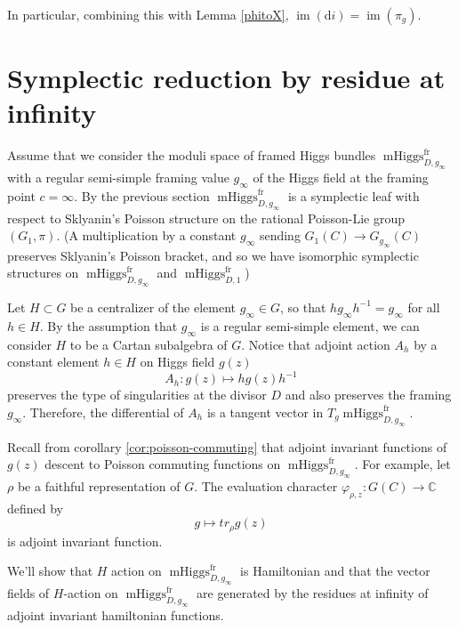 \documentclass[11pt, oneside, reqno]{amsart}
\theoremstyle{definition} \newtheorem{definition}{Definition}[section]
\theoremstyle{definition} \newtheorem{remark}[definition]{Remark}
\theoremstyle{definition} \newtheorem{remarks}[definition]{Remarks}
\theoremstyle{definition} \newtheorem{question}[definition]{Question}
\theoremstyle{definition} \newtheorem*{note}{Note}
\theoremstyle{definition} \newtheorem{example}[definition]{Example}
\theoremstyle{definition} \newtheorem{examples}[definition]{Examples}
\DeclareMathOperator{\tr}{tr}
\DeclareMathOperator{\mhiggs}{mHiggs}
\DeclareMathOperator{\im}{im}
\renewcommand{\d}{\mathrm{d}}
\newcommand{\fr}{\mathrm{fr}}
\begin{document}
In particular, combining this with Lemma \ref{phitoX}, $\im(\d i) = \im(\pi_g)$.



\section{Symplectic reduction by residue at infinity}

Assume that we consider the moduli space of framed Higgs bundles $\mhiggs^{\fr}_{D, g_{\infty}}$ 
with a regular semi-simple framing value $g_{\infty}$ of the Higgs field at the framing point $c = \infty$.
By the previous section $\mhiggs^{\fr}_{D, g_{\infty}}$ is a symplectic leaf with respect
to Sklyanin's Poisson structure on the rational Poisson-Lie group $(G_{1}, \pi)$. (A multiplication
by a constant $g_\infty$ sending $G_{1}(C) \to G_{g_{\infty}}(C)$ preserves
 Sklyanin's Poisson bracket, and so we have isomorphic symplectic structures on $\mhiggs^{\fr}_{D, g_{\infty}}$ and $\mhiggs^{\fr}_{D, 1}$)



Let $H \subset G$ be a centralizer of the element $g_\infty \in G$, so that $h g_\infty h^{-1}  = g_\infty$ for all $h \in H$. By the assumption that $g_\infty$ is a regular semi-simple element,
we can consider $H$ to be a Cartan subalgebra of $G$. Notice that adjoint action $A_{h}$  by
a constant element $h \in H$ on Higgs field $g(z)$
\begin{equation}
A_{h} :  g(z) \mapsto h g(z) h^{-1} 
\end{equation}
preserves the type of singularities at the divisor $D$ and also
preserves  the framing $g_\infty$. Therefore, the differential of $A_{h}$ is
a tangent vector in $T_{g} \mhiggs^{\fr}_{D, g_\infty}$. 

Recall from corollary \ref{cor:poisson-commuting}
 that adjoint invariant functions of $g(z)$ descent to 
 Poisson commuting functions on $\mhiggs^{\fr}_{D, g_\infty}$.
 For example, let $\rho$ be a faithful representation of $G$.
The
evaluation character  $\varphi_{\rho,z}: G(C) \to \mathbb{C}$  defined by
   \begin{equation}
     g \mapsto  tr_{\rho} g(z)
   \end{equation}
 is adjoint invariant function. 


 We'll show that $H$ action on $\mhiggs^{\fr}_{D, g_\infty}$ is Hamiltonian
 and that the vector fields of $H$-action on $\mhiggs^{\fr}_{D, g_\infty}$ are generated by the residues at infinity of adjoint
 invariant hamiltonian functions.
\end{document}
